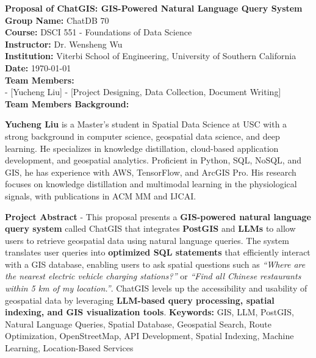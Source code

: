 \documentclass{article}
\begin{document}
\begin{titlepage}
    \centering
    \vspace*{2cm}
    {\Huge \textbf{Proposal of ChatGIS: GIS-Powered Natural Language Query System}} \\
    \vspace{1.5cm}
    \textbf{Group Name:} ChatDB 70 \\
    \textbf{Course:} DSCI 551 - Foundations of Data Science \\
    \textbf{Instructor:} Dr. Wensheng Wu \\
    \textbf{Institution:} Viterbi School of Engineering, University of Southern California \\
    \textbf{Date:} \today \\
    \vfill
    \textbf{Team Members:} \\
    - [Yucheng Liu] - [Project Designing, Data Collection, Document Writing] \\
    

    \vfill
    \textbf{Team Members Background:} \\
    \begin{justify}

        \textbf{Yucheng Liu} is a Master’s student in Spatial Data Science at USC with a strong background in computer science, geospatial data science, and deep learning. He specializes in knowledge distillation, cloud-based application development, and geospatial analytics. Proficient in Python, SQL, NoSQL, and GIS, he has experience with AWS, TensorFlow,  and ArcGIS Pro. His research focuses on knowledge distillation and multimodal learning in the physiological signals, with publications in ACM MM and IJCAI.
        
    \end{justify}

    \vfill
    \begin{justify}
        \textbf{Project Abstract} - This proposal presents a \textbf{GIS-powered natural language query system} called ChatGIS that integrates \textbf{PostGIS} and \textbf{LLMs} to allow users to retrieve geospatial data using natural language queries. The system translates user queries into \textbf{optimized SQL statements} that efficiently interact with a GIS database, enabling users to ask spatial questions such as \textit{``Where are the nearest electric vehicle charging stations?''} or \textit{``Find all Chinese restaurants within 5 km of my location.''}. ChatGIS levels up the accessibility and usability of geospatial data by leveraging \textbf{LLM-based query processing, spatial indexing, and GIS visualization tools}.
        \vfill
        \textbf{Keywords:} GIS, LLM, PostGIS, Natural Language Queries, Spatial Database, Geospatial Search, Route Optimization, OpenStreetMap, API Development, Spatial Indexing, Machine Learning, Location-Based Services
    \end{justify}

\end{titlepage}
\end{document}
